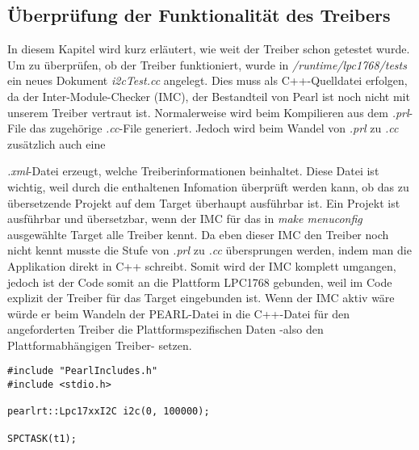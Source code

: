 \subsection{Überprüfung der Funktionalität des Treibers}
In diesem Kapitel wird kurz erläutert, wie weit der Treiber schon getestet wurde.
Um zu überprüfen, ob der Treiber funktioniert, wurde in {\textit{/runtime/lpc1768/tests}} ein neues Dokument {\textit{i2cTest.cc}} angelegt. Dies muss als C++-Quelldatei erfolgen, da der Inter-Module-Checker (IMC), der Bestandteil von Pearl ist noch nicht mit unserem Treiber vertraut ist. 
Normalerweise wird beim Kompilieren aus dem {\textit{.prl}}-File das zugehörige {\textit{.cc}}-File generiert. Jedoch wird beim Wandel von {\textit{.prl}} zu {\textit{.cc}} zusätzlich auch eine {\textit{.xml}-Datei erzeugt, welche Treiberinformationen beinhaltet. Diese Datei ist wichtig, weil durch die enthaltenen Infomation überprüft werden kann, ob das zu übersetzende Projekt auf dem Target überhaupt ausführbar ist. Ein Projekt ist ausführbar und übersetzbar, wenn der IMC für das in {\textit{make menuconfig}} ausgewählte Target alle Treiber kennt. Da eben dieser IMC den Treiber noch nicht kennt musste die Stufe von {\textit{.prl}} zu {\textit{.cc}} übersprungen werden, indem man die Applikation direkt in C++ schreibt. Somit wird der IMC komplett umgangen, jedoch ist der Code somit an die Plattform LPC1768 gebunden, weil im Code explizit der Treiber für das Target eingebunden ist. Wenn der IMC aktiv wäre würde er beim Wandeln der PEARL-Datei in die C++-Datei für den angeforderten Treiber die Plattformspezifischen Daten -also den Plattformabhängigen Treiber- setzen. 
\begin{lstlisting}
#include "PearlIncludes.h"
#include <stdio.h>

pearlrt::Lpc17xxI2C i2c(0, 100000);

SPCTASK(t1);


\end{lstlisting}}
